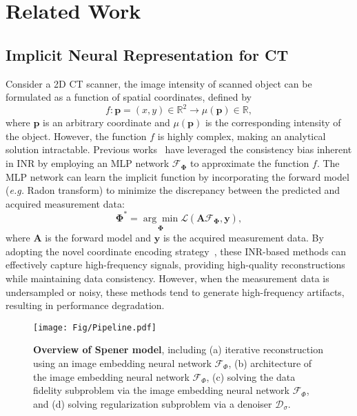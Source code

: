 \section{Related Work}
\subsection{Implicit Neural Representation for CT}
Consider a 2D CT scanner, the image intensity of scanned object can be formulated as a function of spatial coordinates, defined by
\begin{equation}
    f: \mathbf{p} = (x,y) \in \mathbb{R}^2 \longrightarrow \mu(\mathbf{p}) \in \mathbb{R},
\label{eq:inr_ct}
\end{equation}
where $\mathbf{p}$ is an arbitrary coordinate and $\mu(\mathbf{p})$ is the corresponding intensity of the object. However, the function $f$ is highly complex, making an analytical solution intractable. Previous works~\cite{shen2022nerp,zha2022naf,wu2022self} have leveraged the consistency bias inherent in INR by employing an MLP network $\mathcal{F}_{\mathbf{\Phi}}$ to approximate the function $f$.
The MLP network can learn the implicit function by incorporating the forward model (\textit{e.g.} Radon transform) to minimize the discrepancy between the predicted and acquired measurement data:
\begin{equation}
    \mathbf{\Phi}^* = \underset{\mathbf{\Phi}}{\arg\min} \mathcal{L}(\mathbf{A}\mathcal{F}_\mathbf{\Phi}, \mathbf{y}),
\end{equation}
where $\mathbf{A}$ is the forward model and $\mathbf{y}$ is the acquired measurement data.
By adopting the novel coordinate encoding strategy~\cite{muller2022instant}, these INR-based methods can effectively capture high-frequency signals, providing high-quality reconstructions while maintaining data consistency. However, when the measurement data is undersampled or noisy, these methods tend to generate high-frequency artifacts, resulting in performance degradation.
\begin{figure*}[!t]
\centering
\texttt{[image: Fig/Pipeline.pdf]} 
\caption{\textbf{Overview of Spener model}, including (a) iterative reconstruction using an image embedding neural network $\mathcal{F}_\Phi$, (b) architecture of the image embedding neural network $\mathcal{F}_\Phi$, (c) solving the data fidelity subproblem via the image embedding neural network $\mathcal{F}_\Phi$, and (d) solving regularization subproblem via a denoiser $\mathcal{D}_\sigma$.}
\label{fig:pipeline}
\end{figure*}

